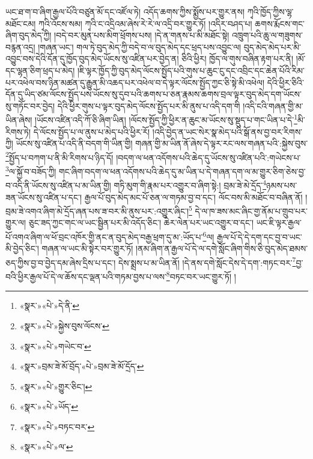 ཡང་ཐ་ག་བ་ཞིག་རྒྱལ་པོའི་བཙུན་མོ་དང་འཛོལ་ཏེ། འདོད་ཆགས་ཀྱིས་སྨྱོས་པར་གྱུར་ནས། ཀྭའི་ཁྱོད་ཀྱིས་ལྷ་མཐོང་ངམ། ཀྭའི་འོངས་སམ། ཀྭའི་ང་འདྲིའམ་ཞེས་རེ་རེ་ལ་འདྲི་བར་གྱུར་ཏོ། །འདིར་བཤད་པ། ཆགས་རྨོངས་གང་ཞིག་བུད་མེད་ཀྱི། །བདེ་བར་མུན་པས་མིག་ཕྲོགས་པས། །དེ་ན་གནས་པ་མི་མཐོང་སྟེ། འཁྲུག་པའི་ཆུ་ལ་གཟུགས་བརྙན་འདྲ། །གཞན་ཡང་། གལ་ཏེ་བུད་མེད་ཀྱི་བདེ་བ་ལ་བུད་མེད་དང་ཕྲད་པས་འབྱུང་ལ། བུད་མེད་མེད་པར་མི་འབྱུང་བས་དེའི་དོན་དུ་ཁྱོད་བུད་མེད་ཡོངས་སུ་འཛིན་པར་བྱེད་ན། ཅིའི་ཕྱིར། ཁྱོད་ལ་གུས་བཞིན་རྟག་པར་ནི། །མོ་དང་ལྷན་ཅིག་ཕྲད་པ་མེད། །ཇི་ལྟར་ཁྱོད་ཀྱི་བུད་མེད་ལོངས་སྤྱོད་པའི་གུས་པ་ཆུང་ངུ་དང་འབྲིང་དང་ཆེན་པོའི་རིམ་པར་འཕེལ་བས་ཉིན་མཚན་དུ་རྒྱུན་མི་འཆད་པར་འཕེལ་བ་དེ་ལྟར་ལོངས་སྤྱོད་ཀྱང་ཅི་སྟེ་མི་འཕེལ། དེའི་ཕྱིར་ཅིའི་དོན་དུ་ཡིད་ཙམ་ལོངས་སྤྱོད་པས་ཡོངས་སུ་དུབ་པའི་ཆགས་པ་ཅན་རྣམས་ཆགས་བྲལ་ལྟར་བུད་མེད་དག་ཡོངས་སུ་གཏོང་བར་བྱེད། དེའི་ཕྱིར་གུས་པ་ལྟར་བུད་མེད་ལོངས་སྤྱོད་པར་མི་ནུས་པ་འདི་དག་གི །འདི་ངའི་གཞན་གྱི་མ་ཡིན་ཞེས། །ཡོངས་འཛིན་འདི་ཀོ་ཅི་ཞིག་ཡིན། །ལོངས་སྤྱོད་ཀྱི་ཕྱིར་ན་ཆུང་མ་ཡོངས་སུ་སྡུད་པ་གང་ཡིན་པ་དེ་\footnote{«སྣར་»«པེ་»དེ་ནི་}མི་རིགས་ཏེ། དེ་ལོངས་སྤྱོད་པ་ལ་ནུས་པ་མེད་པའི་ཕྱིར་རོ། །འདི་བྱེད་ན་ཡང་སེར་སྣ་མེད་པའི་སྒོ་ནས་བྱ་བར་རིགས་ཀྱི། ཡོངས་སུ་འཛིན་པ་འདི་ནི་བདག་གི་ཡིན་གྱི། གཞན་གྱི་མ་ཡིན་ནོ་ཞེས་དེ་ལྟར་རང་ལས་གཞན་པའི་:སྐྱེས་བུས་\footnote{«སྣར་»«པེ་»སྐྱེས་བུས་ལོངས་}སྤྱོད་པ་བཀག་པ་ནི་མི་རིགས་པ་ཉིད་དོ། །བདག་ལ་ཕན་འདོགས་པའི་ཆེད་དུ་ཡོངས་སུ་འཛིན་པའི་:གཡེངས་པ་\footnote{«སྣར་»«པེ་»གཡེང་བ་}ལ་སྐྱོ་བ་བཟོད་ཀྱི། གང་ཞིག་བདག་ལ་ཕན་འདོགས་པའི་ཆེད་དུ་མ་ཡིན་པ་དེ་གཞན་དག་ལ་མ་གྱུར་ཅིག་ཅེས་བྱ་བ་འདི་ནི་ཡོངས་སུ་འཛིན་པ་མ་ཡིན་གྱི། གཏི་མུག་གི་རྣམ་པར་འགྱུར་བ་ཞིག་སྟེ:། བྲམ་ཟེ་མེ་དྲོད་\footnote{«སྣར་»བྲམ་ཟེ་མོ་བྲོད་«པེ་»བྲམ་ཟེ་མོ་དྲོད་}ཉམས་པས་ཟན་ཡོངས་སུ་འཛིན་པ་དང་། རྒྱལ་པོ་བུད་མེད་མང་པོ་ཅན་ལ་གཏམ་བྱ་བ་དང་། ལོང་བས་མི་མཐོང་བ་བཞིན་ནོ། །བྲམ་ཟེ་འགའ་ཞིག་མེ་དྲོད་ཞན་པས་ཟ་བར་མི་ནུས་པར་:འགྱུར་ཞིང་།\footnote{«སྣར་»«པེ་»གྱུར་ཅིང་།} དེ་ལ་ཁ་ཟས་མང་ཞིང་གྱ་ནོམ་པ་གྲུབ་པར་གྱུར་ལ། ཅུང་ཟད་ཀྱང་གང་ལ་ཡང་སྦྱིན་པར་མི་འདོད་ཅིང་། ཆེར་ལེན་པར་ཡང་འགྱུར་བ་དང་། ཡང་ཇི་ལྟར་རྒྱལ་པོ་འགའ་ཞིག་ལ་ཕོ་བྲང་འཁོར་གྱི་ནང་ན་བུད་མེད་བརྒྱ་ཕྲག་དུ་མ་:ཡོད་པ་\footnote{«སྣར་»«པེ་»ཡོད་}ལ། རྒྱལ་པོ་དེ་དེ་དག་དང་བྱ་བ་ཡང་མི་བྱེད་ཅིང་། གཞན་ལ་ཡང་མི་སྟེར་བར་གྱུར་ཏོ། །ནམ་ཞིག་ན་རྒྱལ་པོ་དེ་ལ་དགེ་སློང་ཞིག་གིས་ཅི་བུད་མེད་ཐམས་ཅད་ཀྱིས་བྱ་བ་བྱེད་དམ་ཞེས་དྲིས་པ་དང་། དེས་སྨྲས་པ་མ་ཡིན་ནོ། །དེ་ནས་དགེ་སློང་དེས་དེ་དག་:གཏང་བར་\footnote{«སྣར་»«པེ་»བཏང་བར་}བྱ་བའི་ཕྱིར་རྒྱལ་པོ་དེ་ལ་ཆོས་དང་ལྡན་པའི་གཏམ་བྱས་པ་ལས་\footnote{«སྣར་»«པེ་»ལ་}བཏང་བར་ཡང་གྱུར་ཏོ། །
